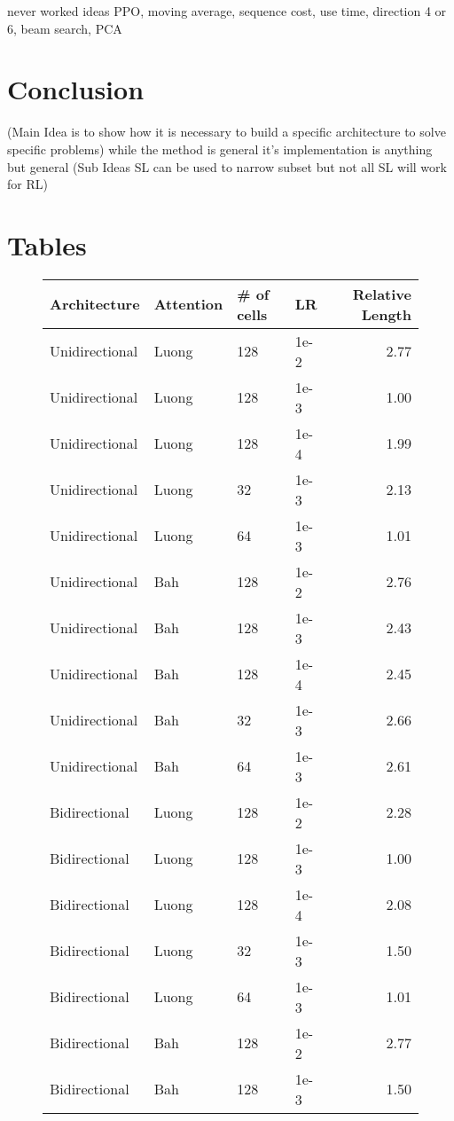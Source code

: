 \documentclass[12pt]{article}
\begin{document}
never worked ideas PPO, moving average, sequence cost, use time, direction 4 or 6, beam search, PCA

\section{Conclusion}
(Main Idea is to show how it is necessary to build a specific architecture to solve specific problems)
    while the method is general it's implementation is anything but general
    (Sub Ideas SL can be used to narrow subset but not all SL will work for RL)

\section*{Tables}

\begin{figure}[!p]
  \centering
  \begin{tabular}{l|l|l|l|r}
    Architecture & Attention & \# of cells & LR & Relative Length\\
    \hline
    Unidirectional & Luong & 128 & 1e-2 & 2.77\\
    Unidirectional & Luong & 128 & 1e-3 & 1.00\\ %
    Unidirectional & Luong & 128 & 1e-4 & 1.99\\
    Unidirectional & Luong & 32 & 1e-3 & 2.13\\
    Unidirectional & Luong & 64 & 1e-3 & 1.01\\
    Unidirectional & Bah & 128 & 1e-2 & 2.76\\
    Unidirectional & Bah & 128 & 1e-3 & 2.43\\
    Unidirectional & Bah & 128 & 1e-4 & 2.45\\
    Unidirectional & Bah & 32 & 1e-3 & 2.66\\
    Unidirectional & Bah & 64 & 1e-3 & 2.61\\
    Bidirectional & Luong & 128 & 1e-2 & 2.28\\
    Bidirectional & Luong & 128 & 1e-3 & 1.00\\ %
    Bidirectional & Luong & 128 & 1e-4 & 2.08\\
    Bidirectional & Luong & 32 & 1e-3 & 1.50\\
    Bidirectional & Luong & 64 & 1e-3 & 1.01\\
    Bidirectional & Bah & 128 & 1e-2 & 2.77\\
    Bidirectional & Bah & 128 & 1e-3 & 1.50\\

\end{tabular}
\end{figure}
\end{document}
